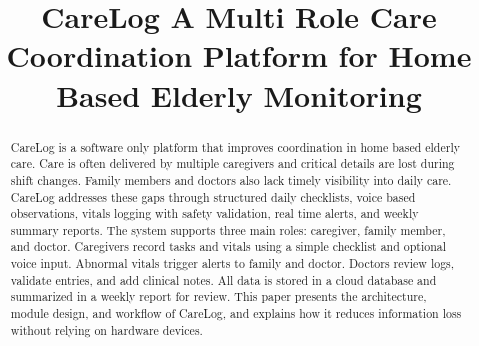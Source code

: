 \documentclass[conference]{IEEEtran}
\begin{document}
\title{CareLog A Multi Role Care Coordination Platform for Home Based Elderly Monitoring}

\author{
\and
{}
\and
{}
\and
{}
}

\maketitle

\begin{abstract}
CareLog is a software only platform that improves coordination in home based elderly care. Care is often delivered by multiple caregivers and critical details are lost during shift changes. Family members and doctors also lack timely visibility into daily care. CareLog addresses these gaps through structured daily checklists, voice based observations, vitals logging with safety validation, real time alerts, and weekly summary reports. The system supports three main roles: caregiver, family member, and doctor. Caregivers record tasks and vitals using a simple checklist and optional voice input. Abnormal vitals trigger alerts to family and doctor. Doctors review logs, validate entries, and add clinical notes. All data is stored in a cloud database and summarized in a weekly report for review. This paper presents the architecture, module design, and workflow of CareLog, and explains how it reduces information loss without relying on hardware devices.
\end{abstract}
\end{document}
